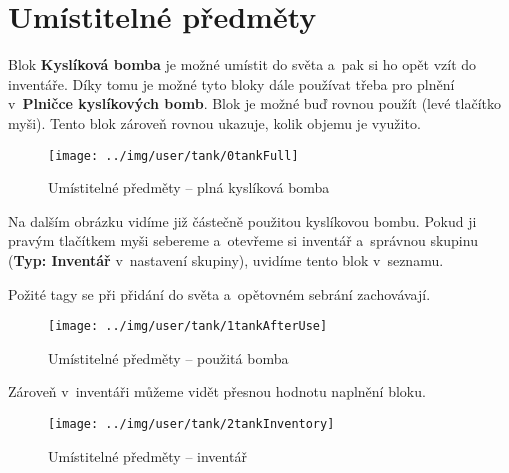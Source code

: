 
\section{Umístitelné předměty}

Blok \textbf{Kyslíková bomba} je možné umístit do světa a~pak si ho opět vzít do inventáře. Díky tomu je možné tyto bloky dále používat třeba pro plnění v~\textbf{Plničce kyslíkových bomb}.
Blok je možné buď rovnou použít (levé tlačítko myši).
Tento blok zároveň rovnou ukazuje, kolik objemu je využito.

\begin{figure}[!ht]\centering
\texttt{[image: ../img/user/tank/0tankFull]}

\caption{Umístitelné předměty -- plná kyslíková bomba}
\label{fig:user_tank_0tankFull}

\end{figure}

\FloatBarrier

Na dalším obrázku vidíme již částečně použitou kyslíkovou bombu. Pokud ji pravým tlačítkem myši sebereme a~otevřeme si inventář a~správnou skupinu (\textbf{Typ: Inventář} v~nastavení skupiny), uvidíme tento blok v~seznamu.

Požité tagy se při přidání do světa a~opětovném sebrání zachovávají.

\begin{figure}[!ht]\centering
\texttt{[image: ../img/user/tank/1tankAfterUse]}

\caption{Umístitelné předměty -- použitá bomba}
\label{fig:user_tank_1tankAfterUse}

\end{figure}

\FloatBarrier

Zároveň v~inventáři můžeme vidět přesnou hodnotu naplnění bloku.

\begin{figure}[!ht]\centering
\texttt{[image: ../img/user/tank/2tankInventory]}

\caption{Umístitelné předměty -- inventář}
\label{fig:user_tank_2tankInventory}

\end{figure}



\FloatBarrier